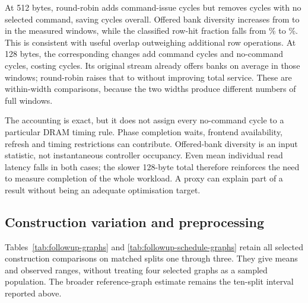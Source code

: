 \begin{table}[htbp]\centering\small
\caption[Scheduling mechanism on the pilot split]{BFS, reference split one, bounded replay. ACT and PRE count row-opening and row-closing commands. ``No command'' counts controller cycles without a selected command. ``Banks'' is the mean number of distinct bank instances in full 64-request input windows wholly within one phase.}\label{tab:followup-mechanism}
\resizebox{\textwidth}{!}{}
\end{table}

At 512 bytes, round-robin adds \RRCmdExtraFloat{} command-issue cycles but removes \RRNoCmdDeltaFloat{} cycles with no selected command, saving \RRStreamDeltaFloat{} cycles overall. Offered bank diversity increases from \RRBanksBeforeFloat{} to \RRBanksAfterFloat{} in the measured windows, while the classified row-hit fraction falls from \RRHitBeforeFloat{}\% to \RRHitAfterFloat{}\%. This is consistent with useful overlap outweighing additional row operations. At 128 bytes, the corresponding changes add \RRCmdExtraCompact{} command cycles and \RRNoCmdDeltaCompact{} no-command cycles, costing \RRStreamDeltaCompact{} cycles. Its original stream already offers \RRBanksBeforeCompact{} banks on average in those windows; round-robin raises that to \RRBanksAfterCompact{} without improving total service. These are within-width comparisons, because the two widths produce different numbers of full windows.

The accounting is exact, but it does not assign every no-command cycle to a particular DRAM timing rule. Phase completion waits, frontend availability, refresh and timing restrictions can contribute. Offered-bank diversity is an input statistic, not instantaneous controller occupancy. Even mean individual read latency falls in both cases; the slower 128-byte total therefore reinforces the need to measure completion of the whole workload. A proxy can explain part of a result without being an adequate optimisation target.

\subsection{Construction variation and preprocessing}
Tables~\ref{tab:followup-graphs} and \ref{tab:followup-schedule-graphs} retain all selected construction comparisons on matched splits one through three. They give means and observed ranges, without treating four selected graphs as a sampled population. The broader reference-graph estimate remains the ten-split interval reported above.

